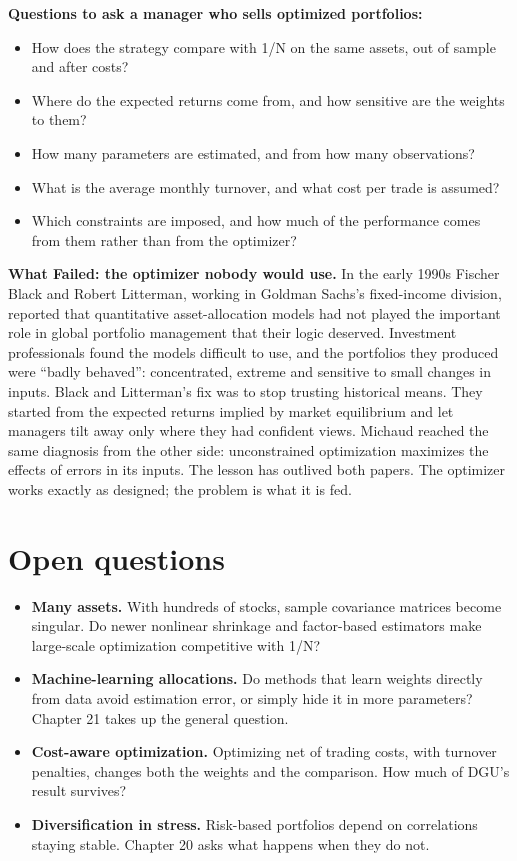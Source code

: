 \textbf{Questions to ask a manager who sells optimized portfolios:}

\begin{itemize}
  \item How does the strategy compare with 1/N on the same assets, out of sample and after costs?
  \item Where do the expected returns come from, and how sensitive are the weights to them?
  \item How many parameters are estimated, and from how many observations?
  \item What is the average monthly turnover, and what cost per trade is assumed?
  \item Which constraints are imposed, and how much of the performance comes from them rather than from the optimizer?
\end{itemize}

\begin{callout}
\textbf{What Failed: the optimizer nobody would use.} In the early 1990s Fischer Black and Robert Litterman, working in Goldman Sachs's fixed-income division, reported that quantitative asset-allocation models had not played the important role in global portfolio management that their logic deserved. Investment professionals found the models difficult to use, and the portfolios they produced were ``badly behaved'': concentrated, extreme and sensitive to small changes in inputs. Black and Litterman's fix was to stop trusting historical means. They started from the expected returns implied by market equilibrium and let managers tilt away only where they had confident views. Michaud reached the same diagnosis from the other side: unconstrained optimization maximizes the effects of errors in its inputs. The lesson has outlived both papers. The optimizer works exactly as designed; the problem is what it is fed.
\end{callout}

\section{Open questions}
\label{sec:19-open}

\begin{itemize}
  \item \textbf{Many assets.} With hundreds of stocks, sample covariance matrices become singular. Do newer nonlinear shrinkage and factor-based estimators make large-scale optimization competitive with 1/N?
  \item \textbf{Machine-learning allocations.} Do methods that learn weights directly from data avoid estimation error, or simply hide it in more parameters? Chapter 21 takes up the general question.
  \item \textbf{Cost-aware optimization.} Optimizing net of trading costs, with turnover penalties, changes both the weights and the comparison. How much of DGU's result survives?
  \item \textbf{Diversification in stress.} Risk-based portfolios depend on correlations staying stable. Chapter 20 asks what happens when they do not.
\end{itemize}

